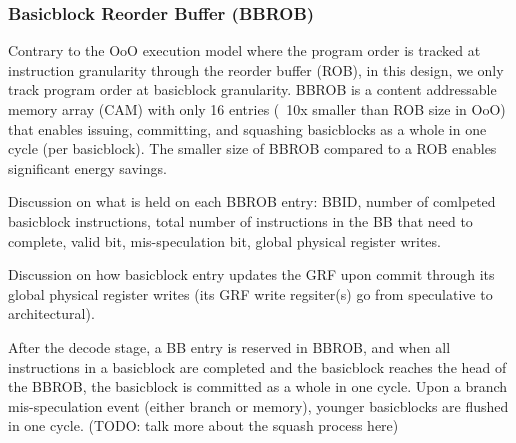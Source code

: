 \subsubsection{Basicblock Reorder Buffer (BBROB)}
\label{sec:bb_rob}

Contrary to the OoO execution model where the program order is tracked at
instruction granularity through the reorder buffer (ROB), in this design, we only
track program order at basicblock granularity. BBROB is a content addressable
memory array (CAM) with only 16 entries (~10x smaller than ROB size in OoO) that
enables issuing, committing, and squashing basicblocks as a whole in one cycle
(per basicblock). The smaller size of BBROB compared to a ROB enables
significant energy savings.

Discussion on what is held on each BBROB entry: BBID, number of comlpeted
basicblock instructions, total number of instructions in the BB that need to
complete, valid bit, mis-speculation bit, global physical register writes.

Discussion on how basicblock entry updates the GRF upon commit through its
global physical register writes (its GRF write regsiter(s) go from speculative
to architectural).

After the decode stage, a BB entry is reserved in BBROB, and when all
instructions in a basicblock are completed and the basicblock reaches the head
of the BBROB, the basicblock is committed as a whole in one cycle. Upon a branch
mis-speculation event (either branch or memory), younger basicblocks are flushed
in one cycle. (TODO: talk more about the squash process here)
